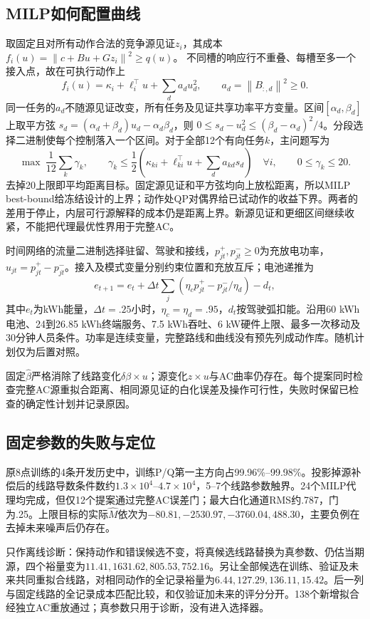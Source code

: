 \documentclass[UTF8,fontset=fandol,11pt,a4paper]{ctexart}
\newcommand{\norm}[1]{\left\lVert#1\right\rVert}
\begin{document}
\subsection{MILP如何配置曲线}
取固定且对所有动作合法的竞争源见证$z_i$，其成本
$f_i(u)=\norm{c+Bu+Gz_i}^2\ge q(u)$。
不同槽的响应行不重叠、每槽至多一个接入点，故在可执行动作上
\[
 f_i(u)=\kappa_i+\ell_i^\top u+\sum_d a_d u_d^2,
 \qquad a_d=\norm{B_{:,d}}^2\ge0.
\]
同一任务的$a_d$不随源见证改变，所有任务及见证共享功率平方变量。区间$[\alpha_d,\beta_d]$上取平方弦
$s_d=(\alpha_d+\beta_d)u_d-\alpha_d\beta_d$，则
$0\le s_d-u_d^2\le(\beta_d-\alpha_d)^2/4$。分段选择二进制使每个控制落入一个区间。对于全部12个有向任务$k$，主问题写为
\begin{equation}
 \max\ \frac1{12}\sum_k\gamma_k,
 \qquad
 \gamma_k\le\frac12(\kappa_{ki}+\ell_{ki}^\top u+\sum_d a_{kd}s_d)\quad\forall i,
 \qquad 0\le\gamma_k\le20.
 \label{eq:fixedtrain-MILP}
\end{equation}
去掉20上限即平均距离目标。固定源见证和平方弦均向上放松距离，所以MILP best-bound给冻结设计的上界；动作处QP对偶界给已试动作的收益下界。两者的差用于停止，内层可行源解释的成本仍是距离上界。新源见证和更细区间继续收紧，不能把代理最优性界用于完整AC。

时间网络的流量二进制选择驻留、驾驶和接线，$p_{jt}^+,p_{jt}^-\ge0$为充放电功率，$u_{jt}=p_{jt}^+-p_{jt}^-$。接入及模式变量分别约束位置和充放互斥；电池递推为
\[
 e_{t+1}=e_t+\Delta t\sum_j(\eta_c p_{jt}^+-p_{jt}^-/\eta_d)-d_t,
\]
其中$e_t$为kWh能量，$\Delta t=.25$小时，$\eta_c=\eta_d=.95$，$d_t$按驾驶弧扣能。沿用60 kWh电池、24到26.85 kWh终端服务、7.5 kWh吞吐、6 kW硬件上限、最多一次移动及30分钟人员条件。功率是连续变量，完整路线和曲线没有预先列成动作库。随机计划仅为后置对照。

固定$\widehat\beta$严格消除了线路变化$\delta\beta\times u$；源变化$z\times u$与AC曲率仍存在。每个提案同时检查完整AC源重拟合距离、相同源见证的白化误差及操作可行性，失败时保留已检查的确定性计划并记录原因。

\subsection{固定参数的失败与定位}
原8点训练的4条开发历史中，训练P/Q第一主方向占99.96\%--99.98\%。投影掉源补偿后的线路导数条件数约$1.3\times10^4$--$4.7\times10^4$，5--7个线路参数触界。24个MILP代理均完成，但仅12个提案通过完整AC误差门；最大白化通道RMS约.787，门为.25。上限目标的实际$\widehat M$依次为$-80.81,-2530.97,-3760.04,488.30$，主要负例在去掉未来噪声后仍存在。

只作离线诊断：保持动作和错误候选不变，将真候选线路替换为真参数、仍估当期源，四个裕量变为$11.41,1631.62,805.53,752.16$。另让全部候选在训练、验证及未来共同重拟合线路，对相同动作的全记录裕量为$6.44,127.29,136.11,15.42$。后一列与固定线路的全记录成本匹配比较，和仅验证加未来的评分分开。138个新增拟合经独立AC重放通过；真参数只用于诊断，没有进入选择器。
\end{document}
